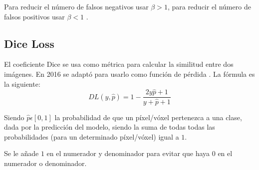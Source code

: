 Para reducir el número de falsos negativos usar $\beta > 1$, para reducir el número de falsos positivos usar $\beta < 1$ \cite{Jadon2020}.

\subsection{Dice Loss}\label{cnn_dice}

El coeficiente Dice se usa como métrica para calcular la similitud entre dos imágenes. En 2016 se adaptó para usarlo como función de pérdida \cite{Cardoso2017}. La fórmula es la siguiente:
\begin{equation}
DL(y,\hat{p})= 1 - \frac{2y\hat{p}+1}{y+\hat{p}+1}
\end{equation}

Siendo $\hat{p}\epsilon[0,1]$ la probabilidad de que un píxel/vóxel pertenezca a una clase, dada por la predicción del modelo, siendo la suma de todas todas las probabilidades (para un determinado píxel/vóxel) igual a $1$.

Se le añade $1$ en el numerador y denominador para evitar que haya $0$ en el numerador o denominador.


